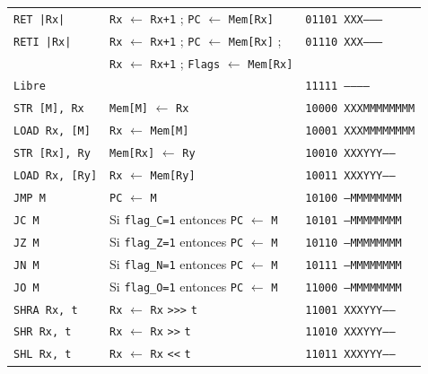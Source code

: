 \documentclass[a4paper,11pt]{article}
\begin{document}
\begin{center}
\begin{tabular}{l|l|l}
\texttt{RET  |Rx|}     & \texttt{Rx} $\leftarrow$ \texttt{Rx+1} ; \texttt{PC} $\leftarrow$ \texttt{Mem[Rx]}    & \texttt{01101 XXX--------} \\  %
\texttt{RETI |Rx|}     & \texttt{Rx} $\leftarrow$ \texttt{Rx+1} ; \texttt{PC} $\leftarrow$ \texttt{Mem[Rx]} ;  & \texttt{01110 XXX--------} \\  %
                       & \texttt{Rx} $\leftarrow$ \texttt{Rx+1} ; \texttt{Flags} $\leftarrow$ \texttt{Mem[Rx]} & \\
\hline
\texttt{Libre}         &                                                                    & \texttt{11111 -----------} \\  %
\hline
\texttt{STR  [M], Rx}  & \texttt{Mem[M]} $\leftarrow$ \texttt{Rx}                           & \texttt{10000 XXXMMMMMMMM} \\  %
\texttt{LOAD Rx, [M]}  & \texttt{Rx} $\leftarrow$ \texttt{Mem[M]}                           & \texttt{10001 XXXMMMMMMMM} \\  %
\texttt{STR  [Rx], Ry} & \texttt{Mem[Rx]} $\leftarrow$ \texttt{Ry}                          & \texttt{10010 XXXYYY-----} \\  %
\texttt{LOAD Rx, [Ry]} & \texttt{Rx} $\leftarrow$ \texttt{Mem[Ry]}                          & \texttt{10011 XXXYYY-----} \\  %
\hline
\texttt{JMP M}         & \texttt{PC} $\leftarrow$ \texttt{M}                                & \texttt{10100 ---MMMMMMMM} \\  %
\texttt{JC M}          & Si \texttt{flag\_C=1} entonces \texttt{PC} $\leftarrow$ \texttt{M} & \texttt{10101 ---MMMMMMMM} \\  %
\texttt{JZ M}          & Si \texttt{flag\_Z=1} entonces \texttt{PC} $\leftarrow$ \texttt{M} & \texttt{10110 ---MMMMMMMM} \\  %
\texttt{JN M}          & Si \texttt{flag\_N=1} entonces \texttt{PC} $\leftarrow$ \texttt{M} & \texttt{10111 ---MMMMMMMM} \\  %
\texttt{JO M}          & Si \texttt{flag\_O=1} entonces \texttt{PC} $\leftarrow$ \texttt{M} & \texttt{11000 ---MMMMMMMM} \\  %
\hline
\texttt{SHRA Rx, t}    & \texttt{Rx} $\leftarrow$ \texttt{Rx} \verb|>>>| \texttt{t}         & \texttt{11001 XXXYYY-----} \\  %
\texttt{SHR Rx, t}     & \texttt{Rx} $\leftarrow$ \texttt{Rx} \verb|>>| \texttt{t}          & \texttt{11010 XXXYYY-----} \\  %
\texttt{SHL Rx, t}     & \texttt{Rx} $\leftarrow$ \texttt{Rx} \verb|<<| \texttt{t}          & \texttt{11011 XXXYYY-----} \\  %

\end{tabular}
\end{center}
\end{document}
